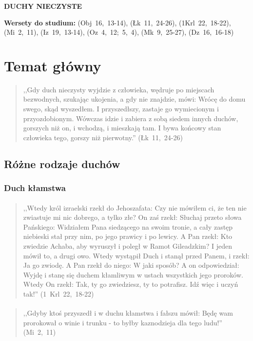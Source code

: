 \documentclass[10pt,a4paper,oneside]{article}
\begin{document}
\centerline{\textbf{\MakeUppercase{Duchy nieczyste}}}
\begin{center}
\textbf{Wersety do studium:} \mbox{(Obj 16, 13-14)}, \mbox{(Łk 11, 24-26)}, \mbox{(1Krl 22, 18-22)}, \mbox{(Mi 2, 11)}, \mbox{(Iz 19, 13-14)}, \mbox{(Oz 4, 12; 5, 4)}, \mbox{(Mk 9, 25-27)}, \mbox{(Dz 16, 16-18)}
\end{center}
\section{Temat główny}
\paragraph{}
\begin{quote}
,,Gdy duch nieczysty wyjdzie z człowieka, wędruje po miejscach bezwodnych, szukając ukojenia, a gdy nie znajdzie, mówi: Wrócę do domu swego, skąd wyszedłem. I przyszedłszy, zastaje go wymiecionym i przyozdobionym. Wówczas idzie i zabiera z sobą siedem innych duchów, gorszych niż on, i wchodzą, i mieszkają tam. I bywa końcowy stan człowieka tego, gorszy niż pierwotny.'' \mbox{(Łk 11, 24-26)}
\end{quote}
\subsection{Różne rodzaje duchów}
\subsubsection{Duch kłamstwa}
\paragraph{}
\begin{quote}
,,Wtedy król izraelski rzekł do Jehoszafata: Czy nie mówiłem ci, że ten nie zwiastuje mi nic dobrego, a tylko złe? On zaś rzekł: Słuchaj przeto słowa Pańskiego: Widziałem Pana siedzącego na swoim tronie, a cały zastęp niebieski stał przy nim, po jego prawicy i po lewicy. A Pan rzekł: Kto zwiedzie Achaba, aby wyruszył i poległ w Ramot Gileadzkim? I jeden mówił to, a drugi owo. Wtedy wystąpił Duch i stanął przed Panem, i rzekł: Ja go zwiodę. A Pan rzekł do niego: W jaki sposób? A on odpowiedział: Wyjdę i stanę się duchem kłamliwym w ustach wszystkich jego proroków. Wtedy On rzekł: Tak, ty go zwiedziesz, ty to potrafisz. Idź więc i uczyń tak!'' \mbox{(1 Krl 22, 18-22)}
\end{quote}
\paragraph{}
\begin{quote}
,,Gdyby ktoś przyszedł i w duchu kłamstwa i fałszu mówił: Będę wam prorokował o winie i trunku - to byłby kaznodzieja dla tego ludu!'' \mbox{(Mi 2, 11)}
\end{quote}
\end{document}
